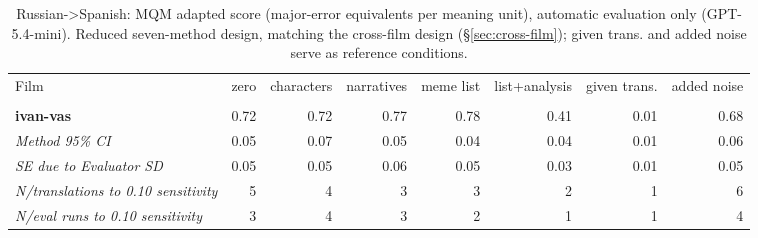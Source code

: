 \begin{table}[ht]
\centering
\begin{adjustbox}{width=\textwidth}
\begin{tabular}{lrrrrr|rr}
Film & zero & characters & narratives & meme list & list+analysis & \multicolumn{1}{|r}{given trans.} & added noise \\
 &  &  &  &  &  &  &  \\
\hline
\textbf{ivan-vas} & 0.72 & 0.72 & 0.77 & 0.78 & 0.41 & 0.01 & 0.68 \\

\emph{Method 95\% CI} & 0.05 & 0.07 & 0.05 & 0.04 & 0.04 & 0.01 & 0.06 \\

\emph{SE due to Evaluator SD} & 0.05 & 0.05 & 0.06 & 0.05 & 0.03 & 0.01 & 0.05 \\

\emph{N/translations to 0.10 sensitivity} & 5 & 4 & 3 & 3 & 2 & 1 & 6 \\

\emph{N/eval runs to 0.10 sensitivity} & 3 & 4 & 3 & 2 & 1 & 1 & 4 \\

\hline
\end{tabular}
\end{adjustbox}
\caption{Russian->Spanish: MQM adapted score (major-error equivalents per meaning unit), automatic evaluation only (GPT-5.4-mini). Reduced seven-method design, matching the cross-film design (\S\ref{sec:cross-film}); given trans. and added noise serve as reference conditions.}
\label{tab:mqm-method-comparison-spanish}
\end{table}
